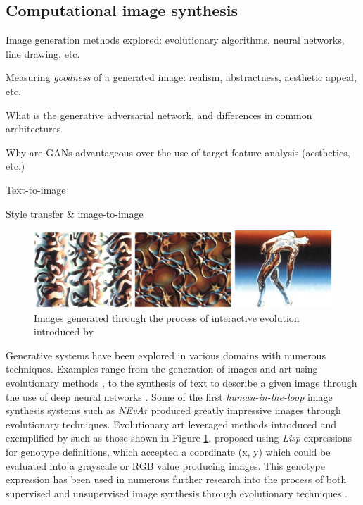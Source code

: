 \documentclass{article}
\begin{document}
\subsection{Computational image synthesis}
\begin{todolist}
	\item Image generation methods explored: evolutionary algorithms, neural networks, line drawing, etc.
	\item Measuring \textit{goodness} of a generated image: realism, abstractness, aesthetic appeal, etc.
	
	\item What is the generative adversarial network, and differences in common architectures
	\item Why are GANs advantageous over the use of target feature analysis (aesthetics, etc.)
	\item Text-to-image
	\item Style transfer \& image-to-image
\end{todolist}

\begin{figure}[h!]
	\includegraphics[width=\textwidth]{images/sims-interactive-image-generation.png}
	\caption{Images generated through the process of interactive evolution introduced by \citet{sims}}
	\label{fig:sims}
\end{figure}

Generative systems have been explored in various domains with numerous techniques.
Examples range from the generation of images and art using evolutionary methods \citep{sims, nevar}, to the synthesis of text to describe a given image through the use of deep neural networks \citep{mathews2016senticap}.
Some of the first \textit{human-in-the-loop} image synthesis systems such as \textit{NEvAr} \citep{nevar} produced greatly impressive images through evolutionary techniques.
Evolutionary art leveraged methods introduced and exemplified by \citet{sims} such as those shown in Figure \ref{fig:sims}.
\citet{sims} proposed using \textit{Lisp} expressions for genotype definitions, which accepted a coordinate (x, y) which could be evaluated into a grayscale or RGB value producing images.
This genotype expression has been used in numerous further research into the process of both supervised and unsupervised image synthesis through evolutionary techniques \citep{nevar, sims, den2011evolving, distributed-evolutionary-art, aesthetic-measures}.
\end{document}
